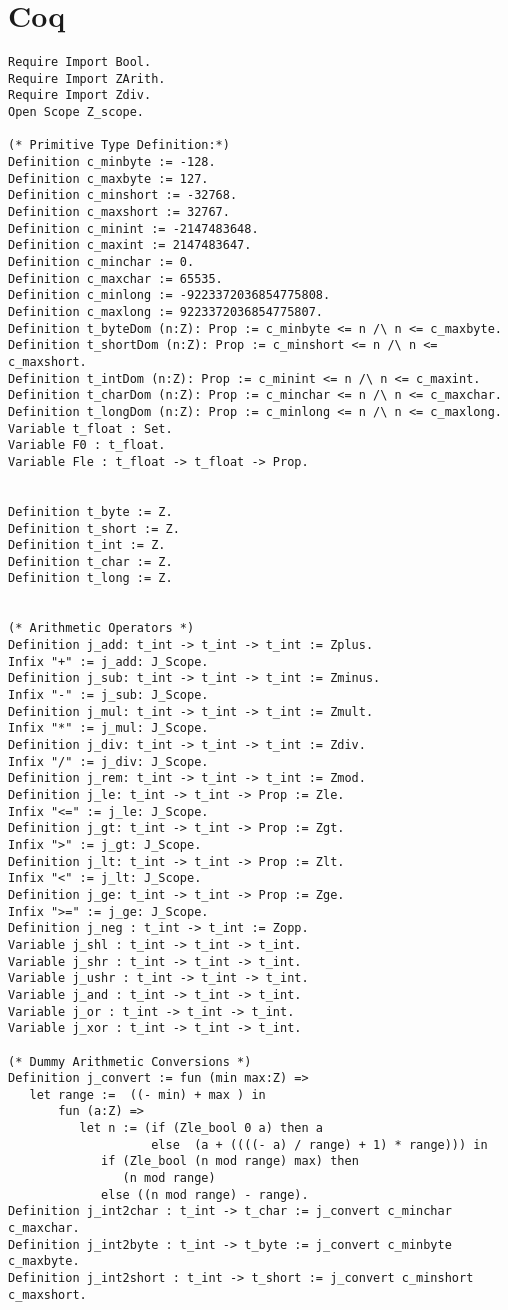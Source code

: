 \section{Coq}
 \begin{verbatim}
Require Import Bool.
Require Import ZArith.
Require Import Zdiv.
Open Scope Z_scope.

(* Primitive Type Definition:*)
Definition c_minbyte := -128.
Definition c_maxbyte := 127.
Definition c_minshort := -32768.
Definition c_maxshort := 32767.
Definition c_minint := -2147483648.
Definition c_maxint := 2147483647.
Definition c_minchar := 0.
Definition c_maxchar := 65535.
Definition c_minlong := -9223372036854775808.
Definition c_maxlong := 9223372036854775807.
Definition t_byteDom (n:Z): Prop := c_minbyte <= n /\ n <= c_maxbyte.
Definition t_shortDom (n:Z): Prop := c_minshort <= n /\ n <= c_maxshort.
Definition t_intDom (n:Z): Prop := c_minint <= n /\ n <= c_maxint.
Definition t_charDom (n:Z): Prop := c_minchar <= n /\ n <= c_maxchar.
Definition t_longDom (n:Z): Prop := c_minlong <= n /\ n <= c_maxlong.
Variable t_float : Set.
Variable F0 : t_float.
Variable Fle : t_float -> t_float -> Prop.


Definition t_byte := Z.
Definition t_short := Z.
Definition t_int := Z.
Definition t_char := Z.
Definition t_long := Z.


(* Arithmetic Operators *)
Definition j_add: t_int -> t_int -> t_int := Zplus.
Infix "+" := j_add: J_Scope.
Definition j_sub: t_int -> t_int -> t_int := Zminus.
Infix "-" := j_sub: J_Scope.
Definition j_mul: t_int -> t_int -> t_int := Zmult.
Infix "*" := j_mul: J_Scope.
Definition j_div: t_int -> t_int -> t_int := Zdiv.
Infix "/" := j_div: J_Scope.
Definition j_rem: t_int -> t_int -> t_int := Zmod.
Definition j_le: t_int -> t_int -> Prop := Zle.
Infix "<=" := j_le: J_Scope.
Definition j_gt: t_int -> t_int -> Prop := Zgt.
Infix ">" := j_gt: J_Scope.
Definition j_lt: t_int -> t_int -> Prop := Zlt.
Infix "<" := j_lt: J_Scope.
Definition j_ge: t_int -> t_int -> Prop := Zge.
Infix ">=" := j_ge: J_Scope.
Definition j_neg : t_int -> t_int := Zopp.
Variable j_shl : t_int -> t_int -> t_int.
Variable j_shr : t_int -> t_int -> t_int.
Variable j_ushr : t_int -> t_int -> t_int.
Variable j_and : t_int -> t_int -> t_int.
Variable j_or : t_int -> t_int -> t_int.
Variable j_xor : t_int -> t_int -> t_int.

(* Dummy Arithmetic Conversions *)
Definition j_convert := fun (min max:Z) =>
   let range :=  ((- min) + max ) in
       fun (a:Z) => 
          let n := (if (Zle_bool 0 a) then a
                    else  (a + ((((- a) / range) + 1) * range))) in
             if (Zle_bool (n mod range) max) then
                (n mod range)
             else ((n mod range) - range).
Definition j_int2char : t_int -> t_char := j_convert c_minchar c_maxchar.
Definition j_int2byte : t_int -> t_byte := j_convert c_minbyte c_maxbyte.
Definition j_int2short : t_int -> t_short := j_convert c_minshort c_maxshort.


\end{verbatim}
